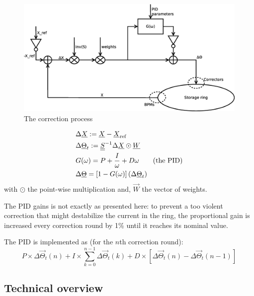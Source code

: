 \begin{figure}[!h]
    \centering
    \includegraphics[width=.85\linewidth]{img/correction}
    \caption{\label{fig:block_correction}The correction process}
\end{figure}


\begin{align}
   & \Delta \underline{X} := \underline{X}-\underline{X}_\text{ref} \nonumber \\
   & \Delta \underline{\Theta}_t :=  \underline{\underline{S}}^{-1} \Delta \underline{X} \odot \underline{W} \nonumber\\
   & G(\omega) = P + \frac{I}{\omega} + D \omega \qquad \text{(the PID)}\nonumber \\
   & \Delta \underline{\Theta} = \left[1-G(\omega)\right] (\Delta \underline{\Theta}_t)
\end{align}
with $\odot$ the point-wise multiplication and, $\vec{W}$ the vector of weights.

\remark The PID gains is not exactly as presented here: to prevent a too violent correction that might destabilize the current in the ring, the proportional gain is increased every correction round by 1\% until it reaches its nominal value.

\remark The PID is implemented as (for the $n$th correction round): 
\begin{equation*}
    P \times \Delta \vec{\Theta}_t(n) + I \times \sum\limits_{k=0}^{n-1}\Delta \vec{\Theta}_t(k) + D \times \left[\Delta \vec{\Theta}_t(n) - \Delta \vec{\Theta}_t(n-1)\right]
\end{equation*}

\subsection{Technical overview}


